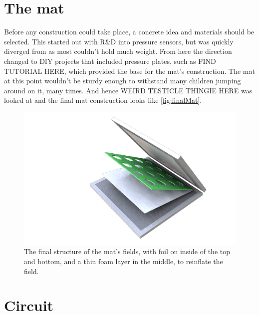\section{The mat}%
	Before any construction could take place, a concrete idea and materials should be selected. This started out with R\&D into pressure sensors, but was quickly diverged from as most couldn't hold much weight. From here the direction changed to DIY projects that included pressure plates, such as FIND TUTORIAL HERE, which provided the base for the mat's construction. The mat at this point wouldn't be sturdy enough to withstand many children jumping around on it, many times. And hence WEIRD TESTICLE THINGIE HERE was looked at and the final mat construction looks like \autoref{fig:finalMat}.\\
	
	\begin{figure}[H]
		\centering
		\includegraphics[width=0.7\linewidth]{figure/Implementation/Medialogyp4mat}
		\caption{The final structure of the mat's fields, with foil on inside of the top and bottom, and a thin foam layer in the middle, to reinflate the field.}
		\label{fig:finalMat}
	\end{figure}
	
	
\section{Circuit}
